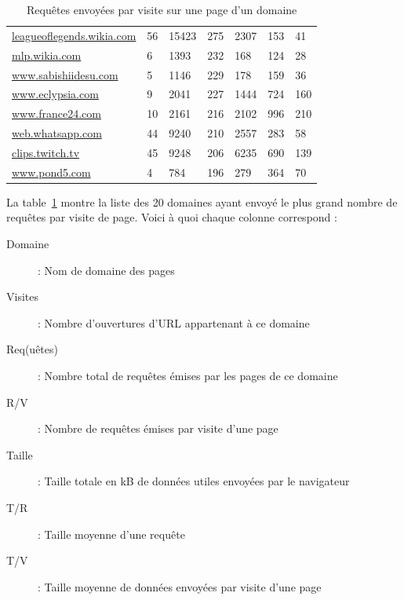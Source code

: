 \begin{table}[]
\begin{tabular}{lllllll}
\scriptsize \url{leagueoflegends.wikia.com} & 56             & 15423         & 275                            & 2307          & 153                     & 41                        \\
\scriptsize \url{mlp.wikia.com}             & 6              & 1393          & 232                            & 168           & 124                     & 28                        \\
\scriptsize \url{www.sabishiidesu.com}      & 5              & 1146          & 229                            & 178           & 159                     & 36                        \\
\scriptsize \url{www.eclypsia.com}          & 9              & 2041          & 227                            & 1444          & 724                     & 160                       \\
\scriptsize \url{www.france24.com}          & 10             & 2161          & 216                            & 2102          & 996                     & 210                       \\
\scriptsize \url{web.whatsapp.com}          & 44             & 9240          & 210                            & 2557          & 283                     & 58                        \\
\scriptsize \url{clips.twitch.tv}           & 45             & 9248          & 206                            & 6235          & 690                     & 139                       \\
\scriptsize \url{www.pond5.com}             & 4              & 784           & 196                            & 279           & 364                     & 70                        \\                     
\end{tabular}
\caption{Requêtes envoyées par visite sur une page d'un domaine}
\label{trackers-1}
\end{table}

			La table~\ref{trackers-1} montre la liste des 20 domaines ayant envoyé le plus grand nombre de requêtes par visite de page. Voici à quoi chaque colonne correspond :
			\begin{description}
				\item[Domaine] : Nom de domaine des pages
				\item[Visites] : Nombre d'ouvertures d'URL appartenant à ce domaine
				\item[Req(uêtes)] : Nombre total de requêtes émises par les pages de ce domaine
				\item[R/V] : Nombre de requêtes émises par visite d'une page
				\item[Taille] : Taille totale en kB de données utiles envoyées par le navigateur
				\item[T/R] : Taille moyenne d'une requête
				\item[T/V] : Taille moyenne de données envoyées par visite d'une page      
			\end{description}

